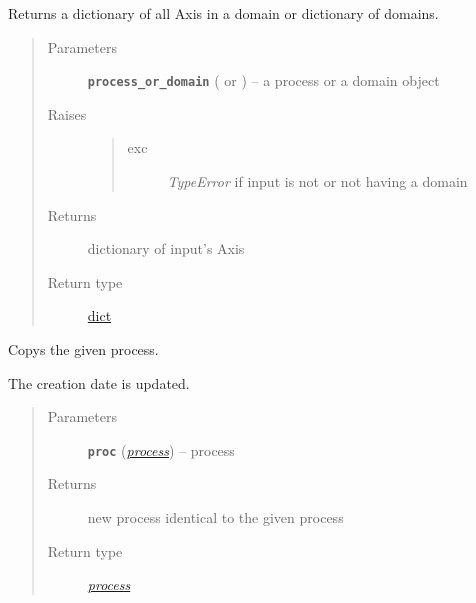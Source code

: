 \documentclass[letterpaper,10pt,english]{sphinxmanual}
\begin{document}

\begin{fulllineitems}
\label{api/climlab.process:climlab.process.process.get_axes}
Returns a dictionary of all Axis in a domain or dictionary of domains.
\begin{quote}\begin{description}
\item[{Parameters}] \leavevmode
\textbf{\texttt{process\_or\_domain}} ({\hyperref[api/climlab.process:module-climlab.process.process]{\emph{}}} or 
{\hyperref[api/climlab.domain:climlab.domain.domain._Domain]{\emph{}}}) -- a process or a domain object

\item[{Raises}] \leavevmode\begin{quote}\begin{description}
\item[{exc}] \leavevmode
\emph{TypeError} if input is not or not having a domain

\end{description}\end{quote}

\item[{Returns}] \leavevmode
dictionary of input's Axis

\item[{Return type}] \leavevmode
\href{http://docs.python.org/2.7/library/stdtypes.html\#dict}{dict}

\end{description}\end{quote}

\end{fulllineitems}


\begin{fulllineitems}
\label{api/climlab.process:climlab.process.process.process_like}
Copys the given process.

The creation date is updated.
\begin{quote}\begin{description}
\item[{Parameters}] \leavevmode
\textbf{\texttt{proc}} ({\hyperref[api/climlab.process:module-climlab.process.process]{\emph{\emph{process}}}}) -- process

\item[{Returns}] \leavevmode
new process identical to the given process

\item[{Return type}] \leavevmode
{\hyperref[api/climlab.process:module-climlab.process.process]{\emph{process}}}

\end{description}\end{quote}

\end{fulllineitems}
\end{document}
